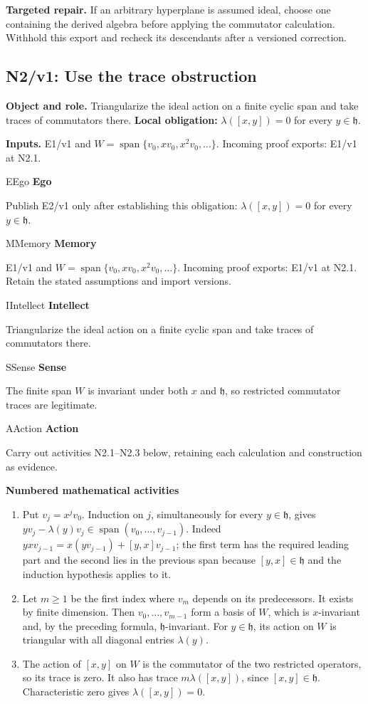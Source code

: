 \documentclass[preprint,12pt,aps,pra,showkeys,amsmath,amssymb,superscriptaddress,floatfix]{revtex4-2}
\theoremstyle{definition}
\theoremstyle{remark}
\newcommand{\mmfaculty}[3]{%
 \begin{mmfacultybox}{#1}{#2}
 {\sffamily\bfseries\color{MMBlue}#2}\par\smallskip #3
 \end{mmfacultybox}}
\newcommand{\field}[2]{\par\smallskip\noindent\textbf{#1.} #2\par}
\begin{document}
\field{Targeted repair}{If an arbitrary hyperplane is assumed ideal, choose one containing the
derived algebra before applying the commutator calculation. Withhold
this export and recheck its descendants after a versioned correction.}

\clearpage

\subsection{N2/v1: Use the trace obstruction}

\field{Object and role}{Triangularize the ideal action on a finite cyclic span and take traces
of commutators there. \textbf{Local obligation:} \(\lambda([x,y])=0\)
for every \(y\in\mathfrak h\).}

\field{Inputs}{E1/v1 and \(W=\operatorname{span}\{v_0,xv_0,x^2v_0,\ldots\}\). Incoming
proof exports: E1/v1 at N2.1.}

\mmfaculty{E}{Ego}{Publish E2/v1 only after establishing this obligation:
\(\lambda([x,y])=0\) for every \(y\in\mathfrak h\).}

\mmfaculty{M}{Memory}{E1/v1 and \(W=\operatorname{span}\{v_0,xv_0,x^2v_0,\ldots\}\). Incoming
proof exports: E1/v1 at N2.1. Retain the stated assumptions and import
versions.}

\mmfaculty{I}{Intellect}{Triangularize the ideal action on a finite cyclic span and take traces
of commutators there.}

\mmfaculty{S}{Sense}{The finite span \(W\) is invariant under both \(x\) and \(\mathfrak h\),
so restricted commutator traces are legitimate.}

\mmfaculty{A}{Action}{Carry out activities N2.1--N2.3 below, retaining each calculation and
construction as evidence.}

\smallskip\noindent\textbf{Numbered mathematical activities}

\begin{enumerate}[label=N2.\arabic*,leftmargin=3.4em]

\item Put \(v_j=x^jv_0\). Induction on \(j\), simultaneously for every
\(y\in\mathfrak h\), gives
\(yv_j-\lambda(y)v_j\in\operatorname{span}(v_0,\ldots,v_{j-1})\). Indeed
\(yxv_{j-1}=x(yv_{j-1})+[y,x]v_{j-1}\); the first term has the required
leading part and the second lies in the previous span because
\([y,x]\in\mathfrak h\) and the induction hypothesis applies to it.

\item Let \(m\ge1\) be the first index where \(v_m\) depends on its
predecessors. It exists by finite dimension. Then \(v_0,\ldots,v_{m-1}\)
form a basis of \(W\), which is \(x\)-invariant and, by the preceding
formula, \(\mathfrak h\)-invariant. For \(y\in\mathfrak h\), its action
on \(W\) is triangular with all diagonal entries \(\lambda(y)\).

\item The action of \([x,y]\) on \(W\) is the commutator of the two restricted
operators, so its trace is zero. It also has trace \(m\lambda([x,y])\),
since \([x,y]\in\mathfrak h\). Characteristic zero gives
\(\lambda([x,y])=0\).

\end{enumerate}
\end{document}
